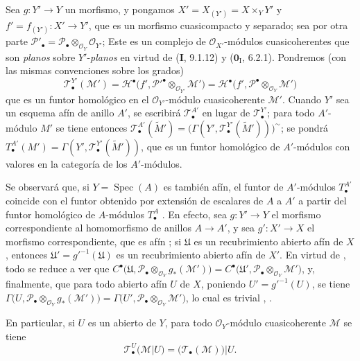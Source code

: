 \begin{env}[7.7.2]
\label{III.7.7.2}
Sea $g:Y'\to Y$ un morfismo, y pongamos
$X'=X_{(Y')}=X\times_Y Y'$ y $f'=f_{(Y')}:X'\longrightarrow Y'$,
que es un morfismo cuasicompacto y separado; sea por otra parte
$\mathscr P'_\bullet=\mathscr P_\bullet\otimes_{\mathscr O_Y}\mathscr O_{Y'}$;
Este es un complejo de $\mathscr O_{X'}$-módulos cuasicoherentes que son \emph{planos}
sobre $Y'$-\emph{planos} en virtud de (\textbf{I}, 9.1.12) y ($\mathbf{0}_{\mathrm I}$, 6.2.1). Pondremos
(con las mismas convenciones sobre los grados)
\[
  \mathscr T^{Y'}_\bullet(\mathscr M')
  =\mathscr H^\bullet
    \bigl(f',\mathscr P'^\bullet\otimes_{\mathscr O_{Y'}}\mathscr M'\bigr)
  =\mathscr H^\bullet
    \bigl(f',\mathscr P^\bullet\otimes_{\mathscr O_Y}\mathscr M'\bigr)
  \tag{7.7.2.1}\label{III.7.7.2.1.fr}
\]
que es un funtor homológico en el $\mathscr O_{Y'}$-módulo cuasicoherente
$\mathscr M'$. Cuando $Y'$ sea un esquema afín de anillo $A'$, se escribirá
$\mathscr T^{A'}_\bullet$ en lugar de $\mathscr T^{Y'}_\bullet$; para todo
$A'$-módulo $M'$ se tiene entonces
$\mathscr T^{A'}_\bullet(\widetilde{M}')=\bigl(\Gamma(Y',\mathscr T^{Y'}_\bullet(\widetilde{M}'))\bigr)^\sim$;
se pondrá
$T^{A'}_\bullet(M')=\Gamma(Y',\mathscr T^{Y'}_\bullet(\widetilde{M}'))$,
que es un funtor homológico de $A'$-módulos con valores en la categoría de los
$A'$-módulos.

Se observará que, si $Y=\operatorname{Spec}(A)$ es también afín, el funtor de
$A'$-módulos $T^{A'}_\bullet$ coincide con el funtor obtenido por extensión de
escalares de $A$ a $A'$ a partir del funtor homológico de $A$-módulos
$T^A_\bullet$ . En efecto, sea $g:Y'\to Y$ el morfismo
correspondiente al homomorfismo de anillos $A\to A'$, y sea $g':X'\to X$ el
morfismo correspondiente, que es afín ; si $\mathfrak U$ es
un recubrimiento abierto afín de $X$, entonces
$\mathfrak U'=g'^{-1}(\mathfrak U)$ es un recubrimiento abierto afín de $X'$.
En virtud de , todo se reduce a ver que
$C^\bullet\bigl(\mathfrak U,\mathscr P_\bullet\otimes_{\mathscr O_Y}g_*(\mathscr M')\bigr)=C^\bullet\bigl(\mathfrak U',\mathscr P_\bullet\otimes_{\mathscr O_Y}\mathscr M'\bigr)$,
y, finalmente, que para todo abierto afín $U$ de $X$, poniendo
$U'=g'^{-1}(U)$, se tiene
$\Gamma\bigl(U,\mathscr P_\bullet\otimes_{\mathscr O_Y}g_*(\mathscr M')\bigr)=\Gamma\bigl(U',\mathscr P_\bullet\otimes_{\mathscr O_Y}\mathscr M'\bigr)$,
lo cual es trivial , .

En particular, si $U$ es un abierto de $Y$, para todo
$\mathscr O_Y$-módulo cuasicoherente $\mathscr M$ se tiene
\[
  \mathscr T^U_\bullet(\mathscr M|U)
  =\bigl(\mathscr T_\bullet(\mathscr M)\bigr)|U.
  \tag{7.7.2.2}\label{III.7.7.2.2.fr}
\]
\end{env}

